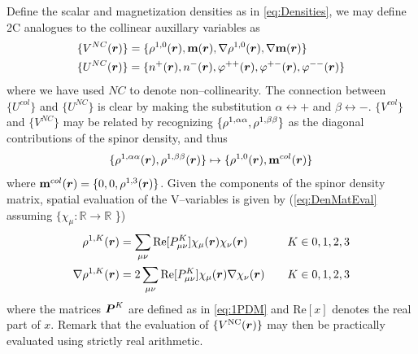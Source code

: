 Define the scalar and magnetization densities as in \cref{eq:Densities}, we may define 2C analogues
to the collinear auxillary variables as
\begin{align}
  \label{eq:NCAuxVar}
  &\{ V^{NC}(\boldsymbol{r}) \} = \{ \rho^{1,0}(\boldsymbol{r}), \mathbf{m}(\boldsymbol{r}), \nabla \rho^{1,0}(\boldsymbol{r}), \nabla \mathbf{m}(\boldsymbol{r}) \} \\
  &\{ U^{NC}(\boldsymbol{r}) \} = \{ n^+(\boldsymbol{r}), n^-(\boldsymbol{r}), \varphi^{++}(\boldsymbol{r}), \varphi^{+-}(\boldsymbol{r}), \varphi^{--}(\boldsymbol{r}) \}
\end{align}
where we have used $NC$ to denote non--collinearity. The connection between $\{U^{col}\}$ and $\{U^{NC}\}$
is clear by making the substitution $\alpha \leftrightarrow +$ and $\beta \leftrightarrow -$. 
$\{V^{col}\}$ and $\{V^{NC}\}$ may be related by recognizing $\{\rho^{1,{\alpha\alpha}},\rho^{1,{\beta\beta}}\}$ as the diagonal contributions
of the spinor density, and thus
\begin{equation}
  \{\rho^{1,{\alpha\alpha}}(\boldsymbol{r}), \rho^{1,{\beta\beta}}(\boldsymbol{r})\} \mapsto \{\rho^{1,0}(\boldsymbol{r}), \mathbf{m}^{col}(\boldsymbol{r})\}
\end{equation}
where $\mathbf{m}^{col}(\boldsymbol{r}) = \{0,0,\rho^{1,3}(\boldsymbol{r})\}$. Given the components of the spinor density matrix,
spatial evaluation of the V--variables is given by (\cref{eq:DenMatEval} assuming $\{ \chi_\mu : \mathbb R \rightarrow \mathbb R$ \})
\begin{alignat}{2}
  \label{eq:VVarEval}
  \rho^{1,K}(\boldsymbol{r}) &= \sum_{\mu\nu} \mathrm{Re}[P^K_{\mu\nu}] \chi_\mu(\boldsymbol{r}) \chi_\nu(\boldsymbol{r}) \quad && K \in{0,1,2,3}\\
  \nabla\rho^{1,K}(\boldsymbol{r}) &= 2\sum_{\mu\nu} \mathrm{Re}[P^K_{\mu\nu}] \chi_\mu(\boldsymbol{r}) \nabla\chi_\nu(\boldsymbol{r})\quad && K \in{0,1,2,3}
\end{alignat}
where the matrices $\boldsymbol{P}^K$ are defined as in \cref{eq:1PDM} and $\mathrm{Re}[x]$ denotes the real part of $x$. Remark that the evaluation of $\{V^{\mathrm{NC}}(\boldsymbol{r})\}$ may then be practically 
evaluated using strictly real arithmetic.

